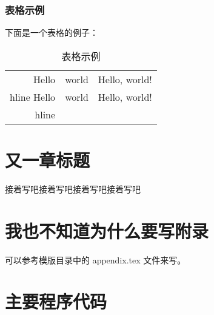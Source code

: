 \documentclass{swfcthesis}
\begin{document}
\subsection{表格示例}

下面是一个表格的例子：

\begin{table}[!ht]
  \centering
  \begin{tabular}{|r|c|l|}    \hline
    Hello&world&Hello, world!\\hline
    Hello&world&Hello, world!\\hline
  \end{tabular}
  \caption{表格示例}
\end{table}

\chapter{又一章标题}

接着写吧接着写吧接着写吧接着写吧


\Appendix{}
\printbibliography[heading={bibintoc},title={参考文献}] %
\advisorinfopage{}                 %
\acknowledgmentspage{}             %


\chapter{我也不知道为什么要写附录} %

可以参考模版目录中的 appendix.tex 文件来写。

\chapter{主要程序代码} %


\begin{listing}[H]
\end{listing}  
\end{document}
